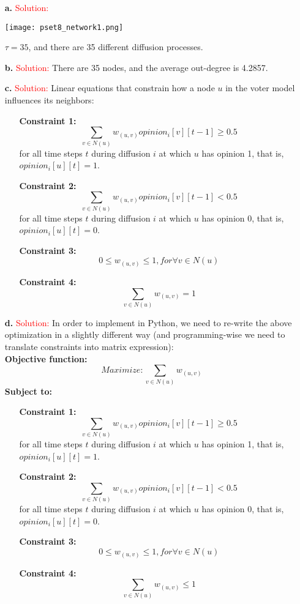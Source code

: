 \documentclass[11pt]{article} %
\begin{document}
\begin{itemize}
\item[\textbf{a. }]  
\textcolor{red}{Solution:}
 \begin{center}
\texttt{[image: pset8\_network1.png]}
\end{center}

$\tau=35$, and there are 35 different diffusion processes.

\item[\textbf{b. }] 
\textcolor{red}{Solution:}
There are 35 nodes, and the average out-degree is 4.2857.

\item[\textbf{c. }] 
\textcolor{red}{Solution:}
Linear equations that constrain how a node $u$ in the voter model influences its neighbors:
\begin{itemize}
	\item[\textbf{Constraint 1:}]
	$$ \sum_{v \in N(u)} w_{(u,v)} opinion_{i}[v][t-1] \ge 0.5 $$ for all time steps $t$ during diffusion $i$ at which $u$ has opinion 1, that is, $opinion_{i}[u][t]=1$.
	\item[\textbf{Constraint 2:}]
	$$  \sum_{v \in N(u)} w_{(u,v)} opinion_{i}[v][t-1] < 0.5 $$ for all time steps $t$ during diffusion $i$ at which $u$ has opinion 0, that is, $opinion_{i}[u][t]=0$.
	\item[\textbf{Constraint 3:}]
	$$ 0 \le w_{(u,v)} \le 1, for \forall v \in N(u)$$
	\item[\textbf{Constraint 4:}]
	$$ \sum_{v \in N(u)} w_{(u,v)}=1 $$
\end{itemize}


\item[\textbf{d. }]  
\textcolor{red}{Solution:}
In order to implement in Python, we need to re-write the above optimization in a slightly different way (and programming-wise we need to translate constraints into matrix expression):\\

\textbf{Objective function:}
$$Maximize:  \sum_{v \in N(u)} w_{(u,v)} $$
\textbf{Subject to:}
\begin{itemize}
	\item[\textbf{Constraint 1:}]
	$$ \sum_{v \in N(u)} w_{(u,v)} opinion_{i}[v][t-1] \ge 0.5 $$ for all time steps $t$ during diffusion $i$ at which $u$ has opinion 1, that is, $opinion_{i}[u][t]=1$.
	\item[\textbf{Constraint 2:}]
	$$  \sum_{v \in N(u)} w_{(u,v)} opinion_{i}[v][t-1] < 0.5 $$ for all time steps $t$ during diffusion $i$ at which $u$ has opinion 0, that is, $opinion_{i}[u][t]=0$.
	\item[\textbf{Constraint 3:}]
	$$ 0 \le w_{(u,v)} \le 1, for \forall v \in N(u)$$
	\item[\textbf{Constraint 4:}]
	$$ \sum_{v \in N(u)} w_{(u,v)} \le 1 $$
\end{itemize}


\end{itemize}
\end{document}

